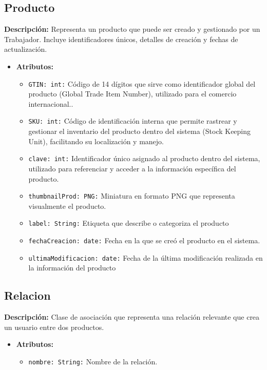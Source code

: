 \documentclass[12pt.a4paper]{article}
\begin{document}
\subsection{Producto}
\textbf{Descripción:} Representa un producto que puede ser creado y gestionado por un Trabajador. Incluye identificadores únicos, detalles de creación y fechas de actualización.
    \begin{itemize}
        \item {\textbf{Atributos:}}
        \begin{itemize}
            \item \texttt{GTIN: int:} Código de 14 dígitos que sirve como identificador global del producto (Global Trade Item Number), utilizado para el comercio internacional..
            \item \texttt{SKU: int:} Código de identificación interna que permite rastrear y gestionar el inventario del producto dentro del sistema (Stock Keeping Unit), facilitando su localización y manejo.
            \item \texttt{clave: int:} Identificador único asignado al producto dentro del sistema, utilizado para referenciar y acceder a la información específica del producto.
            \item \texttt{thumbnailProd: PNG:} Miniatura en formato PNG que representa visualmente el producto.
            \item \texttt{label: String:} Etiqueta que describe o categoriza el producto
            \item \texttt{fechaCreacion: date:} Fecha en la que se creó el producto en el sistema.
            \item \texttt{ultimaModificacion: date:} Fecha de la última modificación realizada en la información del producto
        \end{itemize}
    \end{itemize}

\subsection{Relacion}
\textbf{Descripción:} Clase de asociación que representa una relación relevante que crea un usuario entre dos productos.
    \begin{itemize}
        \item {\textbf{Atributos:}}
        \begin{itemize}
            \item \texttt{nombre: String:} Nombre de la relación.
        \end{itemize}
    \end{itemize}
\end{document}
